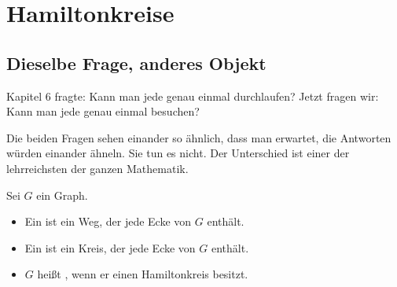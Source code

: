 \chapter{Hamiltonkreise}

\section{Dieselbe Frage, anderes Objekt}

Kapitel 6 fragte: Kann man jede  genau einmal durchlaufen? Jetzt fragen wir: Kann man jede  genau einmal besuchen?

Die beiden Fragen sehen einander so ähnlich, dass man erwartet, die Antworten würden einander ähneln. Sie tun es nicht. Der Unterschied ist einer der lehrreichsten der ganzen Mathematik.

\begin{definition}
Sei $G$ ein Graph.
\begin{itemize}[leftmargin=1.4em, itemsep=4pt]
\item Ein  ist ein Weg, der jede Ecke von $G$ enthält.
\item Ein  ist ein Kreis, der jede Ecke von $G$ enthält.
\item $G$ heißt , wenn er einen Hamiltonkreis besitzt.
\end{itemize}
\end{definition}

